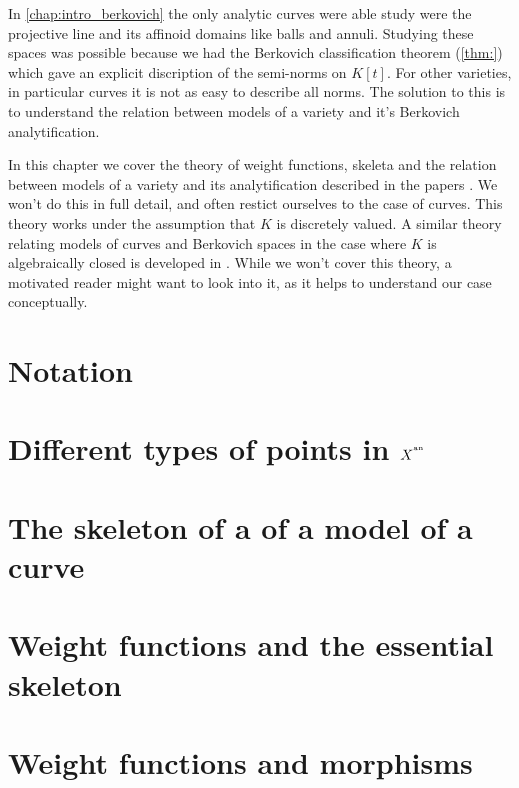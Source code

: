In \cref{chap:intro_berkovich} the only analytic curves were able study were the projective line and its affinoid domains like balls and annuli.
Studying these spaces was possible because we had the Berkovich classification  theorem (\cref{thm:}) which gave an explicit discription of the semi-norms on $K[t]$. 
For other varieties, in particular curves it is not as easy to describe all norms.
The solution to this is to understand the relation between models of a variety and it's Berkovich analytification. 


In this chapter we cover the theory of weight functions, skeleta and the relation between models of a variety and its analytification described in the papers \cite{mustataWeightFunctionsNonArchimedean2015, nicaiseBerkovichSkeletaBirational2016, bakerWeightFunctionsBerkovich2016}.
We won't do this in full detail, and often restict ourselves to the case of curves.
This theory works under the assumption that $K$ is discretely valued. 
A similar theory relating models of curves and Berkovich spaces in the case where $K$ is algebraically closed is developed in \cite{bakerStructureNonarchimedeanAnalytic2013}. 
While we won't cover this theory, a motivated reader might want to look into it, as it helps to understand our case conceptually. 



\section{Notation} \label{sec:notation}


\section{Different types of points in $X^{{}^{\text{an}}}$} \label{sec:different_types_of_points_in_xan}


\section{The skeleton of a of a model of a curve} \label{sec:the_dual_graph_of_a_model_of_a_curve}



\section{Weight functions and the essential skeleton} \label{sec:weight_functions}


\section{Weight functions and morphisms} \label{sec:weight_functions_and_morphisms}



